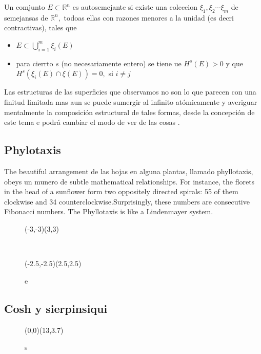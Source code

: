 \documentclass[a4paper]{book}
\newcommand{\Real}{\mathbb R}
\newcommand{\pa}[1]{\left(#1\right)}
\begin{document}
Un comjunto $E\subset \Real^n$ es autosemejante si existe una coleccion $\xi_1,\xi_2 \cdots \xi_m$ de semejansas de $\Real^n,$ todoas ellas con razones menores a la unidad (es decri contractivas), tales que

\begin{itemize}
	\item $E\subset \bigcup^m_{i=1}\xi_i\pa{E}$
	\item para cierrto $s$ (no necesariamente entero) se tiene ue $H^s\pa{E}>0$ y que $H^s\pa{\xi_i\pa{E}\cap \xi\pa{E}}=0,$ si $i\neq j$
\end{itemize}

Las estructuras de las superficies que observamos no son lo que parecen con una finitud limitada mas aun se puede sumergir al infinito atómicamente y averiguar mentalmente la composición estructural de tales formas, desde  la concepción de este tema e podrá cambiar el modo de ver de las cosas .

\subsection{Phylotaxis}
The beautiful arrangement de las hojas en alguna plantas, llamado phyllotaxis, obeys un munero de subtle mathematical relationships. For instance, the florets in the head of a sunflower form two oppositely directed spirals: 55 of them clockwise and 34 counterclockwise.Surprisingly, these numbers are consecutive Fibonacci numbers. The Phyllotaxis is like a Lindenmayer system.


\begin{figure}[!ht]
	\begin{center}
		\begin{pspicture}[showgrid=true](-3,-3)(3,3)
			\psPhyllotaxis[c=4,angle=111]
		\end{pspicture}
		\,
		\begin{pspicture}[showgrid=true](-2.5,-2.5)(2.5,2.5)
			\psPhyllotaxis[angle=99]
		\end{pspicture}
	\end{center}
	\caption{e}
\end{figure}


\subsection{Cosh y sierpinsiqui}

\begin{figure}[!ht]
	\begin{center}
		\begin{pspicture}[showgrid=true](0,0)(13,3.7)
		\end{pspicture}
	\end{center}
	\caption{s}\label{s}
\end{figure}
\end{document}
